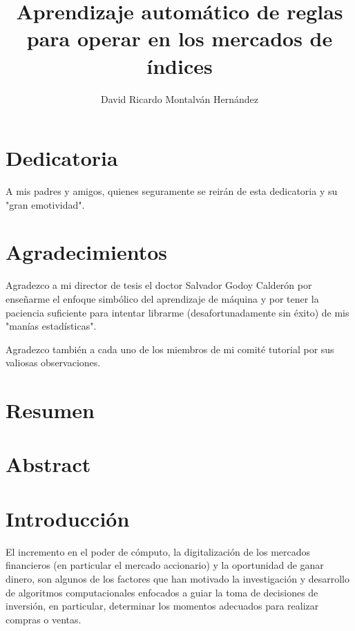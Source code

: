 \documentclass[12pt]{scrbook}
\title{Aprendizaje automático de reglas para operar en los mercados de índices }
\date{}
\author{David Ricardo Montalván Hernández}
\theoremstyle{break}
\theoremstyle{break}
\begin{document}
\maketitle
{} %
\renewcommand{\contentsname}{Contenido}
\tableofcontents
\renewcommand{\listfigurename}{Lista de imágenes}
\listoffigures
\renewcommand{\listtablename}{Lista de tablas}
\renewcommand\tablename{Tabla}
\renewcommand{\bibname}{Referencias}
\renewcommand{\figurename}{Imagen}
\listoftables

\chapter*{Dedicatoria}
A mis padres y amigos, quienes seguramente se reirán de esta dedicatoria y su "gran emotividad".

\chapter*{Agradecimientos}
Agradezco a mi director de tesis el doctor Salvador Godoy Calderón por enseñarme el enfoque simbólico del aprendizaje de máquina y por tener la paciencia suficiente para  intentar librarme (desafortunadamente sin éxito) de mis "manías estadísticas".

Agradezco también a cada uno de los miembros de mi comité tutorial por sus valiosas observaciones.

\chapter*{Resumen}
\chapter*{Abstract}


\chapter{Introducción}
\label{capitulo:introduccion}
El incremento en el poder de cómputo, la digitalización de los mercados financieros (en particular el mercado accionario) y la oportunidad de ganar dinero, son algunos de los factores que han motivado la investigación y desarrollo de algoritmos computacionales enfocados a guiar la toma de decisiones de inversión, en particular, determinar los momentos adecuados para realizar compras o ventas.
\end{document}
